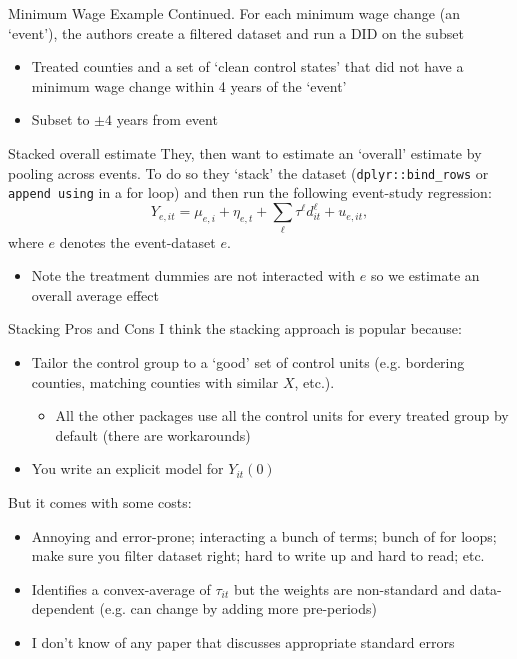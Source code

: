\documentclass[t]{beamer}
\begin{document}
\begin{frame}{Minimum Wage Example Continued.}
  \bigskip
  For each minimum wage change (an `event'), the authors create a filtered dataset and run a DID on the subset 
  \begin{itemize}
    \item Treated counties and a set of `clean control states' that did not have a minimum wage change within 4 years of the `event'
    \item Subset to $\pm 4$ years from event
  \end{itemize}
\end{frame}


\begin{frame}{Stacked overall estimate}
  They, then want to estimate an `overall' estimate by pooling across events. To do so they `stack' the dataset (\texttt{dplyr::bind\_rows} or \texttt{append using} in a for loop) and then run the following event-study regression:
  $$
    Y_{e,it} = \mu_{e,i} + \eta_{e,t} + \sum_{\ell} \tau^\ell d_{it}^\ell + u_{e,it},
  $$
  where $e$ denotes the event-dataset $e$. 
  \begin{itemize}
    \item Note the treatment dummies are not interacted with $e$ so we estimate an overall average effect
  \end{itemize}
\end{frame}

\begin{frame}{Stacking Pros and Cons}
  I think the stacking approach is popular because: 
  \begin{itemize}
    \item Tailor the control group to a `good' set of control units (e.g. bordering counties, matching counties with similar $X$, etc.). 
    \begin{itemize}
      \item All the other packages use all the control units for every treated group by default (there are workarounds)
    \end{itemize}
    
    \item You write an explicit model for $Y_{it}(0)$
  \end{itemize}

  \bigskip
  But it comes with some costs:
  \begin{itemize}
    \item Annoying and error-prone; interacting a bunch of terms; bunch of for loops; make sure you filter dataset right; hard to write up and hard to read; etc.
    \item Identifies a convex-average of $\tau_{it}$ but the weights are non-standard and data-dependent (e.g. can change by adding more pre-periods)
    \item I don't know of any paper that discusses appropriate standard errors
  \end{itemize}
\end{frame}
\end{document}
